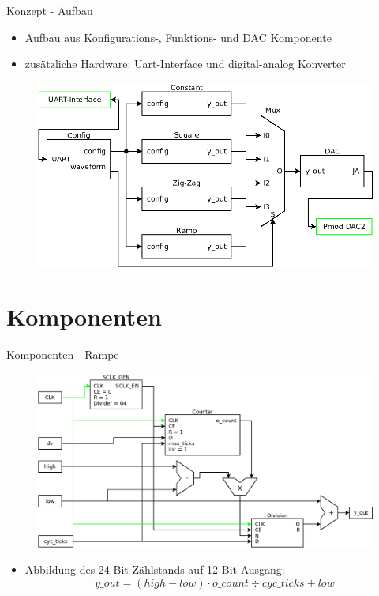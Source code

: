 \documentclass[11pt]{beamer}
\begin{document}
\begin{frame}{Konzept - Aufbau}
  \begin{itemize}
    \item Aufbau aus Konfigurations-, Funktions- und DAC Komponente
    \item zusätzliche Hardware: Uart-Interface und digital-analog Konverter
  \end{itemize}

  \begin{figure}
    \includegraphics[scale=0.36]{fg_diagram_pres}
  \end{figure}
\end{frame}

\section{Komponenten}

\begin{frame}[t]{Komponenten - Rampe}
  \begin{figure}
    \includegraphics[scale=0.28]{ramp}
  \end{figure}
  \begin{itemize}
    \item Abbildung des 24 Bit Zählstands auf 12 Bit Ausgang:
    $$ y\_out = (high - low) \cdot o\_count \div cyc\_ticks + low$$
  \end{itemize}
\end{frame}
\end{document}

